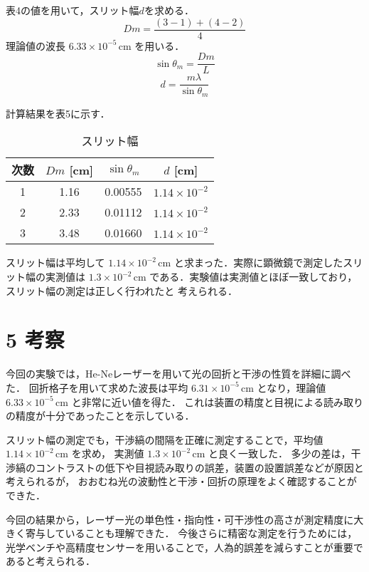 \documentclass[a4paper,11pt,dvipdfmx]{jsarticle}
\begin{document}
表4の値を用いて，スリット幅$d$を求める．
\[
Dm = \frac{(3-1) + (4-2)}{4}
\tag{5}
\]
理論値の波長 $6.33\times 10^{-5}\,\mathrm{cm}$ を用いる．
\[
\sin\theta_m = \frac{Dm}{L}
\tag{6}
\]
\[
d = \frac{m \lambda}{\sin\theta_m}
\tag{7}
\]

計算結果を表5に示す．

\begin{table}[H]
\centering
\caption{スリット幅}
\begin{tabular}{c|c c c}
\hline
次数 & $Dm$ [cm] & $\sin\theta_m$ & $d$ [cm] \\ \hline
1 & 1.16 & 0.00555 & $1.14\times 10^{-2}$ \\
2 & 2.33 & 0.01112 & $1.14\times 10^{-2}$ \\
3 & 3.48 & 0.01660 & $1.14\times 10^{-2}$ \\
\hline
\end{tabular}
\end{table}

スリット幅は平均して $1.14\times 10^{-2}\,\mathrm{cm}$ と求まった．実際に顕微鏡で測定したスリット幅の実測値は
$1.3 \times 10^{-2}\,\mathrm{cm}$ である．実験値は実測値とほぼ一致しており，スリット幅の測定は正しく行われたと
考えられる．

\section*{5 考察}
今回の実験では，He-Neレーザーを用いて光の回折と干渉の性質を詳細に調べた．
回折格子を用いて求めた波長は平均 $6.31\times 10^{-5}\,\mathrm{cm}$ となり，理論値 $6.33\times 10^{-5}\,\mathrm{cm}$ と非常に近い値を得た．
これは装置の精度と目視による読み取りの精度が十分であったことを示している．

スリット幅の測定でも，干渉縞の間隔を正確に測定することで，平均値 $1.14\times 10^{-2}\,\mathrm{cm}$ を求め，
実測値 $1.3 \times 10^{-2}\,\mathrm{cm}$ と良く一致した．
多少の差は，干渉縞のコントラストの低下や目視読み取りの誤差，装置の設置誤差などが原因と考えられるが，
おおむね光の波動性と干渉・回折の原理をよく確認することができた．

今回の結果から，レーザー光の単色性・指向性・可干渉性の高さが測定精度に大きく寄与していることも理解できた．
今後さらに精密な測定を行うためには，光学ベンチや高精度センサーを用いることで，人為的誤差を減らすことが重要であると考えられる．
\end{document}
